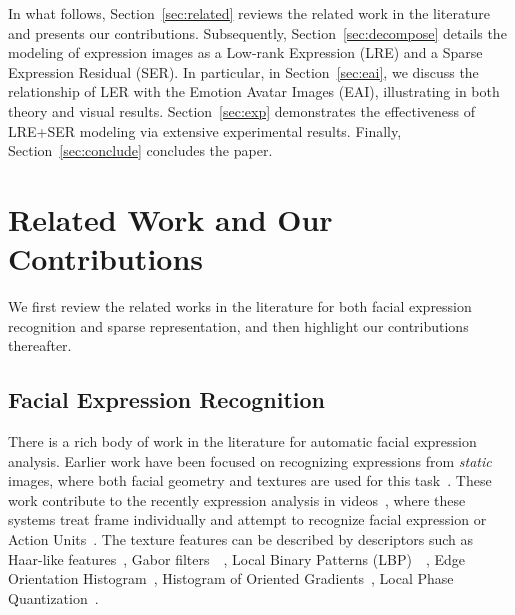 \documentclass[journal]{IEEEtran}
\begin{document}
In what follows, Section~\ref{sec:related} reviews the related work in the literature and presents our contributions. Subsequently, Section~\ref{sec:decompose} details the modeling of expression images as a Low-rank Expression (LRE) and a Sparse Expression Residual (SER). In particular, in Section~\ref{sec:eai}, we discuss the relationship of LER with the Emotion Avatar Images (EAI), illustrating in both theory and visual results. Section~\ref{sec:exp} demonstrates the effectiveness of LRE+SER modeling via extensive experimental results. Finally, Section~\ref{sec:conclude} concludes the paper.


\section{Related Work and Our Contributions\label{sec:related}}

We first review the related works in the literature for both facial expression recognition and sparse representation, and then highlight our contributions thereafter. 

\subsection{Facial Expression Recognition}

There is a rich body of work in the literature for automatic facial expression analysis. Earlier work have been focused on recognizing expressions from \textit{static} images, where both facial geometry and textures are used for this task~\cite{Pantic_PAMI00}\cite{Essa_PAMI97}\cite{Donato_PAMI99}. These work contribute to the recently expression analysis in videos~\cite{Bartlett_FG11}\cite{Kaliouby_SMC04}\cite{Valstar_FERA11}, where these systems treat frame individually and attempt to recognize facial expression or Action Units~\cite{Ekman78}. The texture features can be described by descriptors such as Haar-like features~\cite{Whitehill_FG06}, Gabor filters~\cite{Lyons_PAMI99}~\cite{Bartlett_FG11}, Local Binary Patterns (LBP)~\cite{Shan_IVC09}~\cite{Jiang_FG11}, Edge Orientation Histogram~\cite{Levi_CVPR04}, Histogram of Oriented Gradients~\cite{}\cite{}, Local Phase Quantization~\cite{LPQ}.
\end{document}
